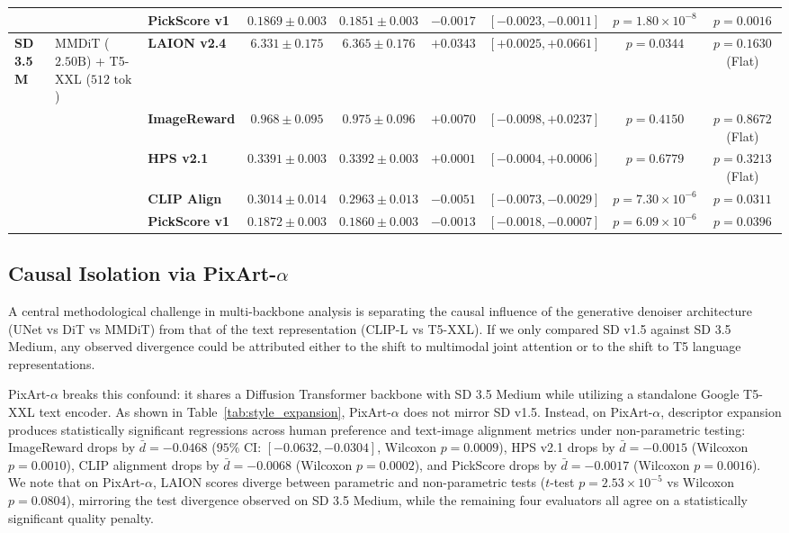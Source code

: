 \documentclass[10pt,twocolumn,letterpaper]{article}
\begin{document}
\begin{table}[t]
{\begin{tabular}{lllcccccc}
& & \textbf{PickScore v1} & $0.1869 \pm 0.003$ & $0.1851 \pm 0.003$ & \textbf{$-0.0017$} & \textbf{$[-0.0023, -0.0011]$} & \textbf{$p = 1.80 \times 10^{-8}$} & \textbf{$p = 0.0016$} \\
\midrule
\textbf{SD 3.5 M} & MMDiT ($2.50\text{B}$) + T5-XXL ($512\text{ tok}$) & \textbf{LAION v2.4} & $6.331 \pm 0.175$ & $6.365 \pm 0.176$ & $+0.0343$ & $[+0.0025, +0.0661]$ & $p = 0.0344$ & $p = 0.1630$ (Flat) \\
& & \textbf{ImageReward} & $0.968 \pm 0.095$ & $0.975 \pm 0.096$ & $+0.0070$ & $[-0.0098, +0.0237]$ & $p = 0.4150$ & $p = 0.8672$ (Flat) \\
& & \textbf{HPS v2.1} & $0.3391 \pm 0.003$ & $0.3392 \pm 0.003$ & $+0.0001$ & $[-0.0004, +0.0006]$ & $p = 0.6779$ & $p = 0.3213$ (Flat) \\
& & \textbf{CLIP Align} & $0.3014 \pm 0.014$ & $0.2963 \pm 0.013$ & \textbf{$-0.0051$} & \textbf{$[-0.0073, -0.0029]$} & \textbf{$p = 7.30 \times 10^{-6}$} & \textbf{$p = 0.0311$} \\
& & \textbf{PickScore v1} & $0.1872 \pm 0.003$ & $0.1860 \pm 0.003$ & \textbf{$-0.0013$} & \textbf{$[-0.0018, -0.0007]$} & \textbf{$p = 6.09 \times 10^{-6}$} & \textbf{$p = 0.0396$} \\
\bottomrule
\end{tabular}%
}
\end{table}

\subsection{\texorpdfstring{Causal Isolation via PixArt-$\alpha$}{Causal Isolation via PixArt-alpha}}
A central methodological challenge in multi-backbone analysis is separating the causal influence of the generative denoiser architecture (UNet vs DiT vs MMDiT) from that of the text representation (CLIP-L vs T5-XXL). If we only compared SD v1.5 against SD 3.5 Medium, any observed divergence could be attributed either to the shift to multimodal joint attention or to the shift to T5 language representations.

PixArt-$\alpha$ breaks this confound: it shares a Diffusion Transformer backbone with SD 3.5 Medium while utilizing a standalone Google T5-XXL text encoder. As shown in Table~\ref{tab:style_expansion}, PixArt-$\alpha$ does not mirror SD v1.5. Instead, on PixArt-$\alpha$, descriptor expansion produces statistically significant regressions across human preference and text-image alignment metrics under non-parametric testing: ImageReward drops by $\bar{d} = -0.0468$ ($95\%\text{ CI: } [-0.0632, -0.0304]$, Wilcoxon $p = 0.0009$), HPS v2.1 drops by $\bar{d} = -0.0015$ (Wilcoxon $p = 0.0010$), CLIP alignment drops by $\bar{d} = -0.0068$ (Wilcoxon $p = 0.0002$), and PickScore drops by $\bar{d} = -0.0017$ (Wilcoxon $p = 0.0016$). We note that on PixArt-$\alpha$, LAION scores diverge between parametric and non-parametric tests ($t$-test $p = 2.53 \times 10^{-5}$ vs Wilcoxon $p = 0.0804$), mirroring the test divergence observed on SD 3.5 Medium, while the remaining four evaluators all agree on a statistically significant quality penalty.
\end{document}
